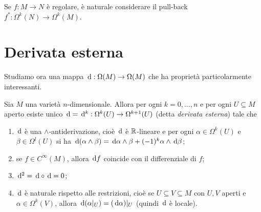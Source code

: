 \begin{remark}
	Se $f:M\to N$ è regolare, è naturale considerare il pull-back $f^*: \Omega^k(N) \to \Omega^k(M)$.
\end{remark}

\section{Derivata esterna}

Studiamo ora una mappa $\,\mathrm d:\Omega(M) \to \Omega(M)$ che ha proprietà particolarmente interessanti.

\begin{theorem}  \label{thm:CostruzioneDerivataEsterna}
	Sia $M$ una varietà $n$-dimensionale. Allora per ogni $k=0,\ldots,n$ e per ogni $U\subseteq M$ aperto esiste unico $\,\mathrm d = \,\mathrm d^k : \Omega^k(U) \to \Omega^{k+1}(U)$ (detta \emph{derivata esterna}) tale che
	\begin{enumerate}
		\item $\,\mathrm d$ è una $\wedge$-antiderivazione, cioè $\,\mathrm d$ è $\mathbb R$-lineare e per ogni $\alpha\in\Omega^k(U)$ e $\beta\in\Omega^l(U)$ si ha $\,\mathrm d(\alpha\wedge\beta) = \,\mathrm d\alpha \wedge \beta +(-1)^k \alpha\wedge \,\mathrm d \beta$; \label{cde:Antiderivazione}
		\item se $f\in C^\infty(M)$, allora $\,\mathrm d f$ coincide con il differenziale di $f$; \label{cde:Cinfinito}
		\item $\,\mathrm d^2 = \,\mathrm d\circ \,\mathrm d = 0$; \label{cde:DDUgualeAZero}
		\item $\,\mathrm d$ è naturale rispetto alle restrizioni, cioè se $U\subseteq V \subseteq M$ con $U,V$ aperti e $\alpha\in\Omega^k(V)$, allora $\,\mathrm d(\alpha|_ U) = (\,\mathrm d\alpha)|_ U$ (quindi $\,\mathrm d$ è locale). \label{cde:Locale}
	\end{enumerate}
\end{theorem}
